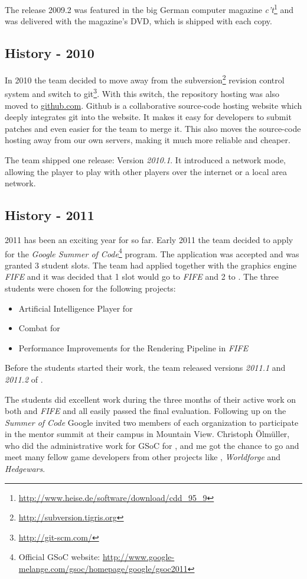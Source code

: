 The release 2009.2 was featured in the big German computer magazine \textit{c't}\footnote{\url{http://www.heise.de/software/download/cdd_95_9}} and was delivered with the magazine's
DVD, which is shipped with each copy. 

\pagebreak

\subsection{History - 2010}
In 2010 the team decided to move away from the subversion\footnote{\url{http://subversion.tigris.org}} revision control
system and switch to git\footnote{\url{http://git-scm.com/}}. With this switch, the repository hosting was also moved to
\href{http://www.github.com}{github.com}. Github is a collaborative source-code hosting website which deeply integrates
git into the website. It makes it easy for developers to submit patches and even easier for the team to merge it. This
also moves the source-code hosting away from our own servers, making it much more reliable and cheaper.

The team shipped one release: Version \textit{2010.1}. It introduced a network mode, allowing the player
to play with other players over the internet or a local area network.

\subsection{History - 2011}
2011 has been an exciting year for \UH{} so far. Early 2011 the team decided to apply for the \textit{Google Summer of
Code}\footnote{Official GSoC website: \url{http://www.google-melange.com/gsoc/homepage/google/gsoc2011}} program. The
application was accepted and \UH{} was granted 3 student slots. The team had applied together with the graphics engine
\textit{FIFE} and it was decided that 1 slot would go to \textit{FIFE} and 2 to \UH{}. The three students were chosen
for the following projects:
\begin{itemize}
    \item Artificial Intelligence Player for \UH{}
    \item Combat for \UH{}
    \item Performance Improvements for the Rendering Pipeline in \textit{FIFE}
\end{itemize}
Before the students started their work, the team released versions \textit{2011.1} and \textit{2011.2} of \UH{}.

The students did excellent work during the three months of their active work on both \UH{} and \textit{FIFE} and all
easily passed the final evaluation. Following up on the \textit{Summer of Code} Google invited two members of each
organization to participate in the mentor summit at their campus in Mountain View. Christoph Ölmüller, who did the
administrative work for GSoC for \UH{}, and me got the chance to go and meet many fellow \OS{} game developers
from other projects like \BOW{}, \textit{Worldforge} and \textit{Hedgewars}.

